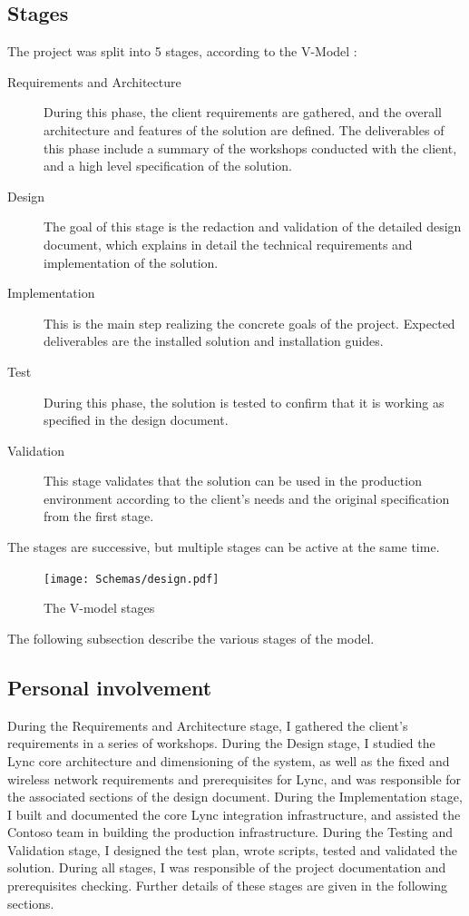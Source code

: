 \subsection{Stages}
	The project was split into 5 stages, according to the V-Model\cite{schuppan_cmm-based_2000, sheffield_systemic_2005} :
	\begin{description}
		\item[Requirements and Architecture] During this phase, the client requirements are gathered, and the overall architecture and features of the solution are defined. The deliverables of this phase include a summary of the workshops conducted with the client, and a high level specification of the solution.
		\item[Design] The goal of this stage is the redaction and validation of the detailed design document, which explains in detail the technical requirements and implementation of the solution.
		\item[Implementation] This is the main step realizing the concrete goals of the project. Expected deliverables are the installed solution and installation guides.
		\item[Test] During this phase, the solution is tested to confirm that it is working as specified in the design document. 
		\item[Validation] This stage validates that the solution can be used in the production environment according to the client's needs and the original specification from the first stage.
	\end{description}
	The stages are successive, but multiple stages can be active at the same time.
	\begin{figure}[H]
		\centering
		\texttt{[image: Schemas/design.pdf]}
		\caption{The V-model stages}
		\label{fig:case_vmodel}
	\end{figure}
	The following subsection describe the various stages of the model.


\subsection{Personal involvement}
	During the Requirements and Architecture stage, I gathered the client's requirements in a series of workshops.
	During the Design stage, I studied the Lync core architecture and dimensioning of the system, as well as the fixed and wireless network requirements and prerequisites for Lync, and was responsible for the associated sections of the design document.
	During the Implementation stage, I built and documented the core Lync integration infrastructure, and assisted the Contoso team in building the production infrastructure. During the Testing and Validation stage, I designed the test plan, wrote scripts, tested and validated the solution. 
	During all stages, I was responsible of the project documentation and prerequisites checking. 
	Further details of these stages are given in the following sections.

